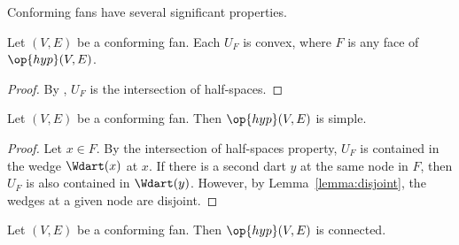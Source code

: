 Conforming fans have several significant properties. 

\begin{lemma}[]
Let $(V,E)$ be a conforming fan.  
Each $U_F$ is convex, where  $F$ is any face of $\op{hyp}(V,E)$.
\end{lemma}
%
%

\begin{proof} By , $U_F$ is the intersection of
half-spaces.
\end{proof}

\begin{lemma}[]  
Let $(V,E)$ be a conforming fan.  
Then $\op{hyp}(V,E)$ is simple.
\end{lemma}
%

\begin{proof} Let $x\in F$.  By the intersection of half-spaces
property, $U_F$ is contained in the wedge $\Wdart(x)$ at $x$.  If
there is a second dart $y$ at the same node in $F$, then $U_F$ is
also contained in $\Wdart(y)$. However, by
Lemma~\ref{lemma:disjoint}, the wedges at a given node are disjoint.
\end{proof}

\begin{lemma}[]  
Let $(V,E)$ be a conforming fan.  
Then $\op{hyp}(V,E)$ is connected.
\end{lemma}
%
%
%


